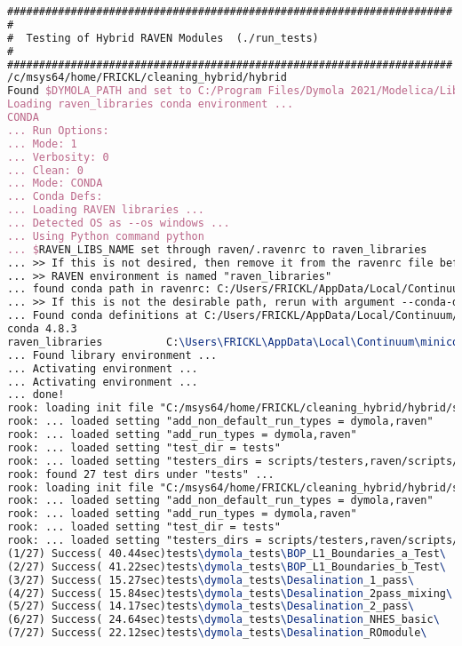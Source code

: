 \begin{lstlisting}[language=tex, basicstyle=\tiny ]
######################################################################
#
#  Testing of Hybrid RAVEN Modules  (./run_tests)
#
######################################################################
/c/msys64/home/FRICKL/cleaning_hybrid/hybrid
Found $DYMOLA_PATH and set to C:/Program Files/Dymola 2021/Modelica/Library/python_interface/dymola.egg
Loading raven_libraries conda environment ...
CONDA
... Run Options:
... Mode: 1
... Verbosity: 0
... Clean: 0
... Mode: CONDA
... Conda Defs:
... Loading RAVEN libraries ...
... Detected OS as --os windows ...
... Using Python command python
... $RAVEN_LIBS_NAME set through raven/.ravenrc to raven_libraries
... >> If this is not desired, then remove it from the ravenrc file before running.
... >> RAVEN environment is named "raven_libraries"
... found conda path in ravenrc: C:/Users/FRICKL/AppData/Local/Continuum/miniconda3/etc/profile.d/conda.sh
... >> If this is not the desirable path, rerun with argument --conda-defs [path] or remove the entry from raven/.ravenrc file.
... Found conda definitions at C:/Users/FRICKL/AppData/Local/Continuum/miniconda3/etc/profile.d/conda.sh
conda 4.8.3
raven_libraries          C:\Users\FRICKL\AppData\Local\Continuum\miniconda3\envs\raven_libraries
... Found library environment ...
... Activating environment ...
... Activating environment ...
... done!
rook: loading init file "C:/msys64/home/FRICKL/cleaning_hybrid/hybrid/scripts/rook.ini"
rook: ... loaded setting "add_non_default_run_types = dymola,raven"
rook: ... loaded setting "add_run_types = dymola,raven"
rook: ... loaded setting "test_dir = tests"
rook: ... loaded setting "testers_dirs = scripts/testers,raven/scripts/TestHarness/testers/"
rook: found 27 test dirs under "tests" ...
rook: loading init file "C:/msys64/home/FRICKL/cleaning_hybrid/hybrid/scripts/rook.ini"
rook: ... loaded setting "add_non_default_run_types = dymola,raven"
rook: ... loaded setting "add_run_types = dymola,raven"
rook: ... loaded setting "test_dir = tests"
rook: ... loaded setting "testers_dirs = scripts/testers,raven/scripts/TestHarness/testers/"
(1/27) Success( 40.44sec)tests\dymola_tests\BOP_L1_Boundaries_a_Test\
(2/27) Success( 41.22sec)tests\dymola_tests\BOP_L1_Boundaries_b_Test\
(3/27) Success( 15.27sec)tests\dymola_tests\Desalination_1_pass\
(4/27) Success( 15.84sec)tests\dymola_tests\Desalination_2pass_mixing\
(5/27) Success( 14.17sec)tests\dymola_tests\Desalination_2_pass\
(6/27) Success( 24.64sec)tests\dymola_tests\Desalination_NHES_basic\
(7/27) Success( 22.12sec)tests\dymola_tests\Desalination_ROmodule\

\end{lstlisting}
